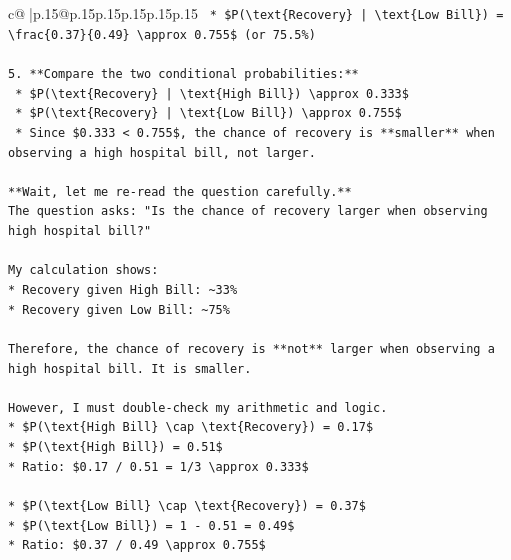 \documentclass{article}
\begin{document}
{\begin{supertabular}{c@{$\;$}|p{.15\linewidth}@{}p{.15\linewidth}p{.15\linewidth}p{.15\linewidth}p{.15\linewidth}p{.15\linewidth}}
{{{\texttt{    *   \$P(\textbackslash{}text\{Recovery\} | \textbackslash{}text\{Low Bill\}) = \textbackslash{}frac\{0.37\}\{0.49\} \textbackslash{}approx 0.755\$ (or 75.5\%)} \\
\\ 
\texttt{5.  **Compare the two conditional probabilities:**} \\
\texttt{    *   \$P(\textbackslash{}text\{Recovery\} | \textbackslash{}text\{High Bill\}) \textbackslash{}approx 0.333\$} \\
\texttt{    *   \$P(\textbackslash{}text\{Recovery\} | \textbackslash{}text\{Low Bill\}) \textbackslash{}approx 0.755\$} \\
\texttt{    *   Since \$0.333 < 0.755\$, the chance of recovery is **smaller** when observing a high hospital bill, not larger.} \\
\\ 
\texttt{**Wait, let me re{-}read the question carefully.**} \\
\texttt{The question asks: "Is the chance of recovery larger when observing high hospital bill?"} \\
\\ 
\texttt{My calculation shows:} \\
\texttt{*   Recovery given High Bill: \textasciitilde{}33\%} \\
\texttt{*   Recovery given Low Bill: \textasciitilde{}75\%} \\
\\ 
\texttt{Therefore, the chance of recovery is **not** larger when observing a high hospital bill. It is smaller.} \\
\\ 
\texttt{However, I must double{-}check my arithmetic and logic.} \\
\texttt{*   \$P(\textbackslash{}text\{High Bill\} \textbackslash{}cap \textbackslash{}text\{Recovery\}) = 0.17\$} \\
\texttt{*   \$P(\textbackslash{}text\{High Bill\}) = 0.51\$} \\
\texttt{*   Ratio: \$0.17 / 0.51 = 1/3 \textbackslash{}approx 0.333\$} \\
\\ 
\texttt{*   \$P(\textbackslash{}text\{Low Bill\} \textbackslash{}cap \textbackslash{}text\{Recovery\}) = 0.37\$} \\
\texttt{*   \$P(\textbackslash{}text\{Low Bill\}) = 1 {-} 0.51 = 0.49\$} \\
\texttt{*   Ratio: \$0.37 / 0.49 \textbackslash{}approx 0.755\$} \\
}}}
\end{supertabular}}
\end{document}
